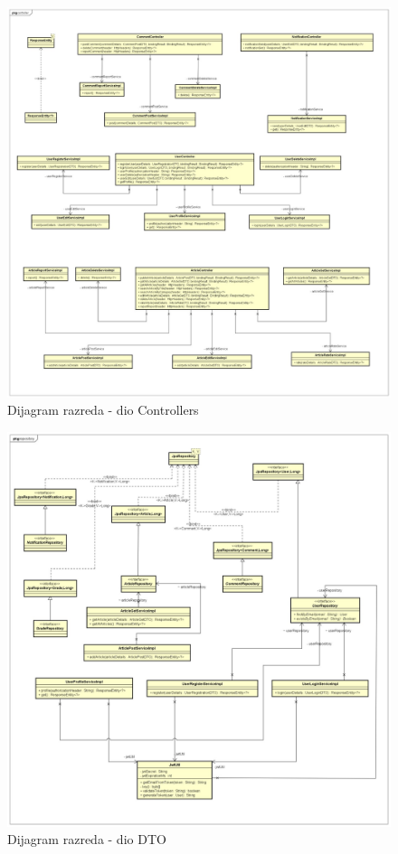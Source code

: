 			\eject

			\begin{figure}[H]
				\includegraphics[scale=0.4]{slike/DijagramRazreda1.jpg}
				\centering
				\caption{Dijagram razreda - dio Controllers}
				\label{fig:class_diagram_controllers}
			\end{figure}

			\eject

			\begin{figure}[H]
				\includegraphics[scale=0.4]{slike/DijagramRazreda2.jpg}
				\centering
				\caption{Dijagram razreda - dio DTO}
				\label{fig:class_diagram_dto}
			\end{figure}

